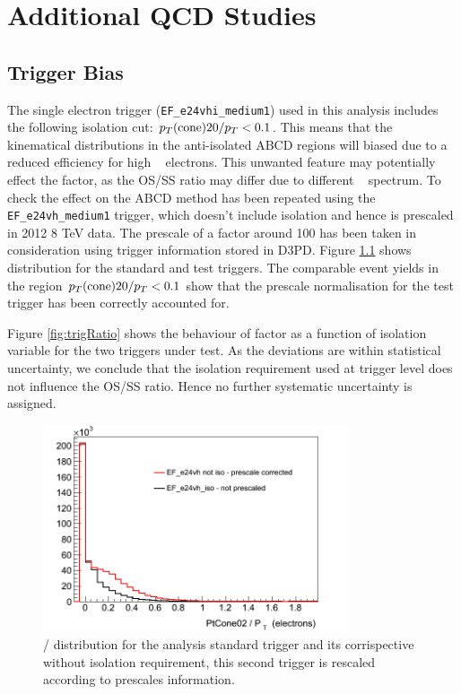 \chapter{Additional QCD Studies}\label{appendix:qcd}

\section{Trigger Bias}

The single electron trigger (\verb=EF_e24vhi_medium1=) used in this analysis includes the following isolation cut: $p_{T}(\mathrm{cone})20 / p_{T} < 0.1$.
This means that the kinematical distributions in the anti-isolated ABCD regions will biased due to a reduced efficiency for high \pt~ electrons. This unwanted feature may potentially effect the \rqcd factor, as the OS/SS ratio may differ due to different \PT~ spectrum. 
To check the effect on \rqcd the ABCD method has been repeated using the \verb=EF_e24vh_medium1= trigger, which doesn't include isolation and hence is prescaled in 2012 8 TeV data. The prescale of a factor around 100 has been taken in consideration using trigger information stored in D3PD. Figure \ref{fig:prescale} shows 
\ptcone distribution for the standard and test triggers. The comparable event yields in the region $p_{T}(\mathrm{cone})20 / p_{T} < 0.1$ show that the prescale normalisation for the test trigger has been correctly accounted for.

Figure \ref{fig:trigRatio} shows the behaviour of \rqcd factor as a function of isolation variable for the two triggers under test.
As the deviations are within statistical uncertainty,  we conclude that the isolation requirement used at trigger level does not influence
the OS/SS ratio. Hence no further systematic uncertainty is assigned.



\begin{figure}[t]
\begin{center}
\includegraphics[width=9cm]{figure/appendix/trigger_comp.png}
\end{center}
\caption{\ptcone / \PT distribution for the analysis standard trigger and  its corrispective without isolation requirement,
this second trigger is rescaled according to prescales information.} 
\label{fig:prescale}
\end{figure}

